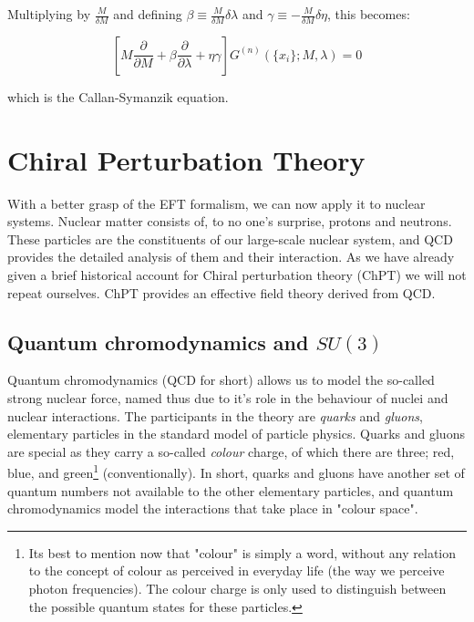 \documentclass[10pt,twoside]{report}
\begin{document}
	Multiplying by $\frac{M}{\delta M}$ and defining $\beta \equiv \frac{M}{\delta M}\delta\lambda$ and $\gamma \equiv - \frac{M}{\delta M}\delta \eta$, this becomes:
	
	\begin{equation}
		\left[ M\frac{\partial}{\partial M} + \beta\frac{\partial}{\partial \lambda} + \eta\gamma \right]G^{(n)}(\{x_i\};M,\lambda) = 0
	\end{equation}
	
	\noindent which is the Callan-Symanzik equation.
	
	\newpage
	\chapter{Chiral Perturbation Theory}
	With a better grasp of the EFT formalism, we can now apply it to nuclear systems. Nuclear matter consists of, to no one's surprise, protons and neutrons. These particles are the constituents of our large-scale nuclear system, and QCD provides the detailed analysis of them and their interaction. As we have already given a brief historical account for Chiral perturbation theory (ChPT) we will not repeat ourselves. ChPT provides an effective field theory derived from QCD.
	
	\section{Quantum chromodynamics and $SU(3)$}
	Quantum chromodynamics (QCD for short) allows us to model the so-called strong nuclear force, named thus due to it's role in the behaviour of nuclei and nuclear interactions. The participants in the theory are \emph{quarks} and \emph{gluons}, elementary particles in the standard model of particle physics. Quarks and gluons are special as they carry a so-called \emph{colour} charge, of which there are three; red, blue, and green\footnote{Its best to mention now that "colour" is simply a word, without any relation to the concept of colour as perceived in everyday life (the way we perceive photon frequencies). The colour charge is only used to distinguish between the possible quantum states for these particles.} (conventionally). In short, quarks and gluons have another set of quantum numbers not available to the other elementary particles, and quantum chromodynamics model the interactions that take place in "colour space".\\
	
	
\end{document}
